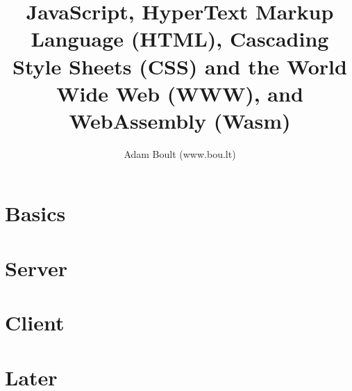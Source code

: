 \documentclass[oneside]{book}
\begin{document}
\author{Adam Boult (www.bou.lt)}
\title{JavaScript, HyperText Markup Language (HTML), Cascading Style Sheets (CSS) and the World Wide Web (WWW), and WebAssembly (Wasm)}
\maketitle

\setcounter{tocdepth}{0}
\tableofcontents



\part{Basics}







\part{Server}







\part{Client}




\part{Later}


\end{document}
